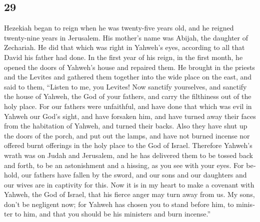 \begin{paracol}{2}
\begin{otherlanguage}{english}
\hypertarget{section-57}{%
\section{29}\label{section-57}}

 Hezekiah began to reign when he was twenty-five years
old, and he reigned twenty-nine years in Jerusalem. His mother's name
was Abijah, the daughter of Zechariah.  He did that which
was right in Yahweh's eyes, according to all that David his father had
done.  In the first year of his reign, in the first month,
he opened the doors of Yahweh's house and repaired them. 
He brought in the priests and the Levites and gathered them together
into the wide place on the east,  and said to them,
``Listen to me, you Levites! Now sanctify yourselves, and sanctify the
house of Yahweh, the God of your fathers, and carry the filthiness out
of the holy place.  For our fathers were unfaithful, and
have done that which was evil in Yahweh our God's sight, and have
forsaken him, and have turned away their faces from the habitation of
Yahweh, and turned their backs.  Also they have shut up
the doors of the porch, and put out the lamps, and have not burned
incense nor offered burnt offerings in the holy place to the God of
Israel.  Therefore Yahweh's wrath was on Judah and
Jerusalem, and he has delivered them to be tossed back and forth, to be
an astonishment and a hissing, as you see with your eyes. 
For behold, our fathers have fallen by the sword, and our sons and our
daughters and our wives are in captivity for this.  Now
it is in my heart to make a covenant with Yahweh, the God of Israel,
that his fierce anger may turn away from us.  My sons,
don't be negligent now; for Yahweh has chosen you to stand before him,
to minister to him, and that you should be his ministers and burn
incense.''


\end{otherlanguage}
\end{paracol}
